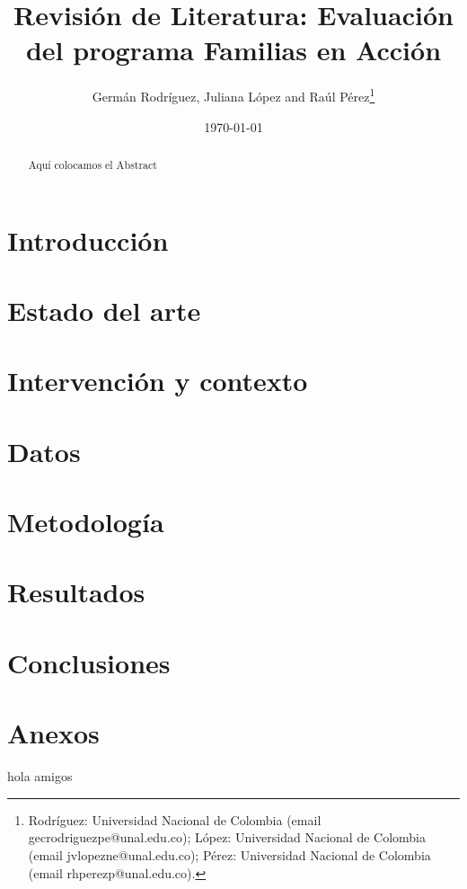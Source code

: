 \documentclass[AER]{AEA}
\begin{document}
\title{Revisión de Literatura: Evaluación del programa Familias en Acción}
\author{Germán Rodríguez, Juliana López and Raúl Pérez\thanks{Rodríguez: Universidad Nacional de Colombia (email gecrodriguezpe@unal.edu.co); López: Universidad Nacional de Colombia (email jvlopezne@unal.edu.co); Pérez: Universidad Nacional de Colombia (email rhperezp@unal.edu.co).}}
\date{\today}

\begin{abstract}
Aquí colocamos el Abstract
\end{abstract}

\maketitle

\section{Introducción}

\section{Estado del arte}

\section{Intervención y contexto}

\section{Datos}

\section{Metodología}

\section{Resultados}

\section{Conclusiones}

\section{Anexos}

hola amigos

\newpage


\end{document}
